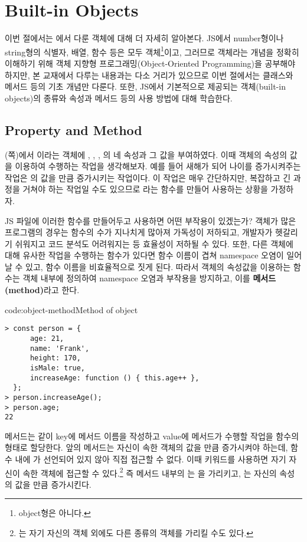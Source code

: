 \section{Built-in Objects}\label{sect:built-in-objects}

이번 절에서는 에서 다룬 객체에 대해 더 자세히 알아본다. JS에서 number형이나 string형의 식별자, 배열, 함수 등은 모두 객체\footnote{object형은 아니다.}이고, 그러므로 객체라는 개념을 정확히 이해하기 위해 객체 지향형 프로그래밍(Object-Oriented Programming)을 공부해야 하지만, 본 교재에서 다루는 내용과는 다소 거리가 있으므로 이번 절에서는 클래스와 메서드 등의 기초 개념만 다룬다. 또한, JS에서 기본적으로 제공되는 객체(built-in objects)의 종류와 속성과 메서드 등의 사용 방법에 대해 학습한다.

\subsection*{Property and Method}

(\pageref{code:object-type}쪽)에서 이라는 객체에 , , , 의 네 속성과 그 값을 부여하였다. 이때  객체의 속성의 값을 이용하여 수행하는 작업을 생각해보자. 예를 들어 새해가 되어 나이를 증가시켜주는 작업은 의 값을 만큼 증가시키는 작업이다. 이 작업은 매우 간단하지만, 복잡하고 긴 과정을 거쳐야 하는 작업일 수도 있으므로 라는 함수를 만들어 사용하는 상황을 가정하자.

JS 파일에 이러한 함수를 만들어두고 사용하면 어떤 부작용이 있겠는가? 객체가 많은 프로그램의 경우는 함수의 수가 지나치게 많아져 가독성이 저하되고, 개발자가 헷갈리기 쉬워지고 코드 분석도 어려워지는 등 효율성이 저하될 수 있다. 또한, 다른 객체에 대해 유사한 작업을 수행하는 함수가 있다면 함수 이름이 겹쳐 namespace 오염이 일어날 수 있고, 함수 이름을 비효율적으로 짓게 된다. 따라서 객체의 속성값을 이용하는 함수는 객체 내부에 정의하여 namespace 오염과 부작용을 방지하고, 이를 \textbf{메서드(method)}라고 한다.

\begin{codeenv}{code:object-method}{Method of object}\begin{verbatim}
> const person = {
      age: 21,
      name: 'Frank',
      height: 170,
      isMale: true,
      increaseAge: function () { this.age++ },
  };
> person.increaseAge();
> person.age;
22
\end{verbatim}
\end{codeenv}

메서드는 \와 같이 key에 메서드 이름을 작성하고 value에 메서드가 수행할 작업을 함수의 형태로 할당한다. 앞의  메서드는 자신이 속한  객체의  값을 만큼 증가시켜야 하는데, 함수 내에 가 선언되어 있지 않아 직접 접근할 수 없다. 이때  키워드를 사용하면 자기 자신이 속한 객체에 접근할 수 있다.\footnote{는 자기 자신의 객체 외에도 다른 종류의 객체를 가리킬 수도 있다.} 즉  메서드 내부의 는 을 가리키고, 는 자신의 속성 의 값을 만큼 증가시킨다.

